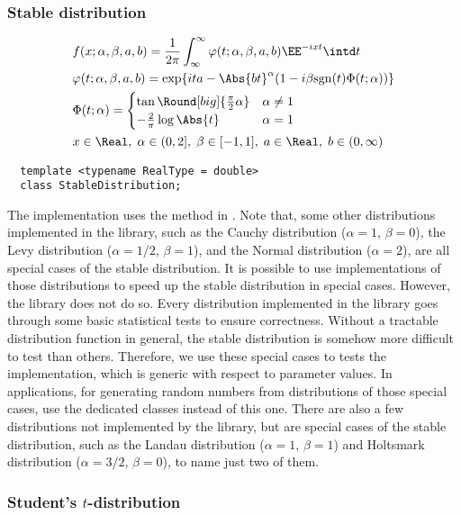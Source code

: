 \subsubsection{Stable distribution}
\begin{align*}
  &f(x;\alpha,\beta,a,b) = \frac{1}{2\pi}\int_{\infty}^{\infty}
  \varphi(t;\alpha,\beta,a,b)\EE^{-ixt}\intd t\\
  &\varphi(t;\alpha,\beta,a,b) = \exp\{ita - \Abs{bt}^{\alpha}(1 -
  i\beta\mathrm{sgn}(t)\Phi(t;\alpha))\} \\
  &\Phi(t;\alpha) = \begin{cases}
    \tan\Round[big]{\frac{\pi}{2}\alpha} & \alpha \ne 1 \\
    -\frac{2}{\pi}\log\Abs{t}            & \alpha = 1
  \end{cases} \\
  & x \in \Real,\;
  \alpha \in (0, 2],\; \beta \in [-1, 1],\; a \in \Real,\; b \in (0, \infty)
\end{align*}
\begin{Verbatim}
  template <typename RealType = double>
  class StableDistribution;
\end{Verbatim}
The implementation uses the method in \cite{Chambers:1976dv}. Note that, some
other distributions implemented in the library, such as the Cauchy distribution
($\alpha = 1$, $\beta = 0$), the Levy distribution ($\alpha = 1/2$, $\beta =
1$), and the Normal distribution ($\alpha = 2$), are all special cases of the
stable distribution. It is possible to use implementations of those
distributions to speed up the stable distribution in special cases. However,
the library does not do so. Every distribution implemented in the library goes
through some basic statistical tests to ensure correctness. Without a tractable
distribution function in general, the stable distribution is somehow more
difficult to test than others. Therefore, we use these special cases to tests
the implementation, which is generic with respect to parameter values. In
applications, for generating random numbers from distributions of those special
cases, use the dedicated classes instead of this one. There are also a few
distributions not implemented by the library, but are special cases of the
stable distribution, such as the Landau distribution ($\alpha = 1$, $\beta =
1$) and Holtsmark distribution ($\alpha = 3/2$, $\beta = 0$), to name just two
of them.

\subsubsection{Student's $t$-distribution}

